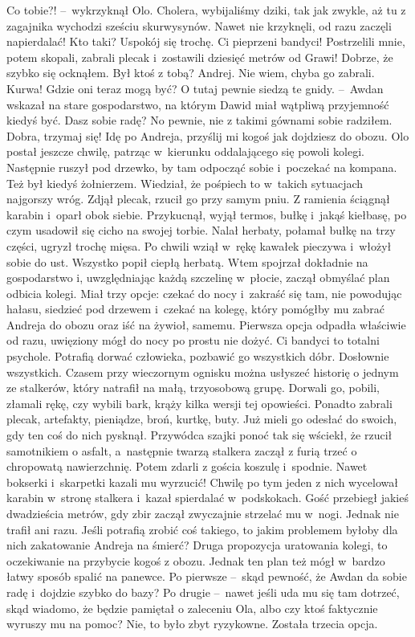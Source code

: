 \documentclass[../MAIN.tex]{subfiles}
\begin{document}
\dd
\sd
\xx Co tobie?! --~wykrzyknął Olo.
\xx Cholera, wybijaliśmy dziki, tak jak zwykle, aż tu z zagajnika wychodzi sześciu skurwysynów. Nawet nie krzyknęli, od razu zaczęli napierdalać!
\xx Kto taki? Uspokój się trochę.
\xx Ci pieprzeni bandyci! Postrzelili mnie, potem skopali, zabrali plecak i~zostawili dziesięć metrów od Grawi! Dobrze, że szybko się ocknąłem.
\xx Był ktoś z tobą?
\xx Andrej. Nie wiem, chyba go zabrali.
\xx Kurwa! Gdzie oni teraz mogą być?
\xx O tutaj pewnie siedzą te gnidy. --~Awdan wskazał na stare gospodarstwo, na którym Dawid miał wątpliwą przyjemność kiedyś być.
\xx Dasz sobie radę?
\xx No pewnie, nie z takimi gównami sobie radziłem.
\xx Dobra, trzymaj się! Idę po Andreja, przyślij mi kogoś jak dojdziesz do obozu.
\qd
\dd
\mm  Olo postał jeszcze chwilę, patrząc w~kierunku oddalającego się powoli kolegi. Następnie ruszył pod drzewko, by tam odpocząć sobie i~poczekać na kompana. Też był kiedyś żołnierzem. Wiedział, że pośpiech to w~takich sytuacjach najgorszy wróg. Zdjął plecak, rzucił go przy samym pniu. Z ramienia ściągnął karabin i~oparł obok siebie. Przykucnął, wyjął termos, bułkę i~jakąś kiełbasę, po czym usadowił się cicho na swojej torbie. Nalał herbaty, połamał bułkę na trzy części, ugryzł trochę mięsa. Po chwili wziął w~rękę kawałek pieczywa i~włożył sobie do ust. Wszystko popił ciepłą herbatą. Wtem spojrzał dokładnie na gospodarstwo i, uwzględniając każdą szczelinę w~płocie, zaczął obmyślać plan odbicia kolegi. Miał trzy opcje: czekać do nocy i~zakraść się tam, nie powodując hałasu, siedzieć pod drzewem i~czekać na kolegę, który pomógłby mu zabrać Andreja do obozu oraz iść na żywioł, samemu.
\pp
Pierwsza opcja odpadła właściwie od razu, uwięziony mógł do nocy po prostu nie dożyć. Ci bandyci to totalni psychole. Potrafią dorwać człowieka, pozbawić go wszystkich dóbr. Dosłownie wszystkich. Czasem przy wieczornym ognisku można usłyszeć historię o jednym ze stalkerów, który natrafił na małą, trzyosobową grupę. Dorwali go, pobili, złamali rękę, czy wybili bark, krąży kilka wersji tej opowieści. Ponadto zabrali plecak, artefakty, pieniądze, broń, kurtkę, buty. Już mieli go odesłać do swoich, gdy ten coś do nich pysknął. Przywódca szajki ponoć tak się wściekł, że rzucił samotnikiem o asfalt, a~następnie twarzą stalkera zaczął z furią trzeć o chropowatą nawierzchnię. Potem zdarli z gościa koszulę i~spodnie. Nawet bokserki i~skarpetki kazali mu wyrzucić! Chwilę po tym jeden z nich wycelował karabin w~stronę stalkera i~kazał spierdalać w~podskokach. Gość przebiegł jakieś dwadzieścia metrów, gdy zbir zaczął zwyczajnie strzelać mu w~nogi. Jednak nie trafił ani razu. Jeśli potrafią zrobić coś takiego, to jakim
problemem byłoby dla nich zakatowanie Andreja na śmierć?
\pp
Druga propozycja uratowania kolegi, to oczekiwanie na przybycie kogoś z obozu. Jednak ten plan też mógł w~bardzo łatwy sposób spalić na panewce. Po pierwsze --~skąd pewność, że Awdan da sobie radę i~dojdzie szybko do bazy? Po drugie --~nawet jeśli uda mu się tam dotrzeć, skąd wiadomo, że będzie pamiętał o zaleceniu Ola, albo czy ktoś faktycznie wyruszy mu na pomoc? Nie, to było zbyt ryzykowne. Została trzecia opcja.
\end{document}
